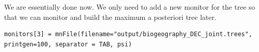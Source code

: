 We are essentially done now. We  only need to add a new monitor for the tree so that we can monitor and build the maximum a posteriori tree later.
{\tt \small \begin{snugshade*}
\begin{lstlisting}
monitors[3] = mnFile(filename="output/biogeography_DEC_joint.trees", printgen=100, separator = TAB, psi)
\end{lstlisting}
\end{snugshade*}}





\newpage
